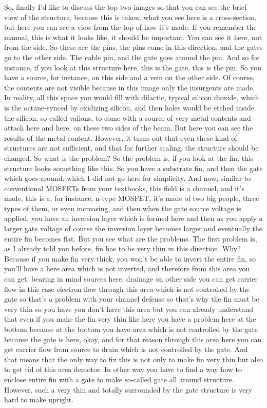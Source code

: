 So, finally I'd like to discuss the top two images so that you can see the brief view of the structure, because this is taken, what you see here is a cross-section, but here you can see a view from the top of how it's made. If you remember the manual, this is what it looks like, it should be important. You can see it here, not from the side. So these are the pins, the pins come in this direction, and the gates go to the other side. The cable pin, and the gate goes around the pin. And so for instance, if you look at this structure here, this is the gate, this is the pin. So you have a source, for instance, on this side and a vein on the other side. Of course, the contents are not visible because in this image only the insurgents are made. In reality, all this space you would fill with dilactic, typical silicon dioxide, which is the octane-synced by oxidizing silicon, and then holes would be etched inside the silicon, so called valions, to come with a source of very metal contents and attach here and here, on these two sides of the beam. But here you can see the results of the metal content. However, it turns out that even these kind of structures are not sufficient, and that for further scaling, the structure should be changed. So what is the problem? So the problem is, if you look at the fin, this structure looks something like this. So you have a substrate fin, and then the gate which goes around, which I did not go here for simplicity. And now, similar to conventional MOSFETs from your textbooks, this field is a channel, and it's made, this is a, for instance, n-type MOSFET, it's made of two big people, three types of them, or even increasing, and then when the gate source voltage is applied, you have an inversion layer which is formed here and then as you apply a larger gate voltage of course the inversion layer becomes larger and eventually the entire fin becomes flat. But you see what are the problems. The first problem is, as I already told you before, fin has to be very thin in this direction. Why? Because if you make fin very thick, you won't be able to invert the entire fin, so you'll have a here area which is not inverted, and therefore from this area you can get, bearing in mind sources here, drainage on other side you can get carrier flow in this case electron flow through this area which is not controlled by the gate so that's a problem with your channel defense so that's why the fin must be very thin so you have you don't have this area but you can already understand that even if you make the fin very thin like here you have a problem here at the bottom because at the bottom you have area which is not controlled by the gate because the gate is here, okay, and for that reason through this area here you can get carrier flow from source to drain which is not controlled by the gate. And that means that the only way to fix this is not only to make fin very thin but also to get rid of this area demotor. In other way you have to find a way how to enclose entire fin with a gate to make so-called gate all around structure. However, such a very thin and totally surrounded by the gate structure is very hard to make upright.
